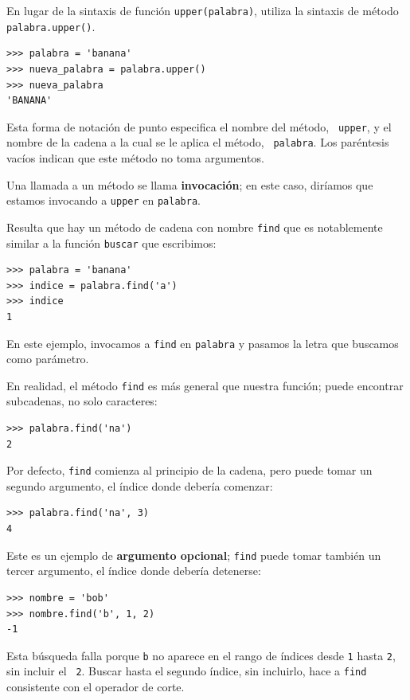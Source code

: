 \documentclass[10pt]{book}
\begin{document}
En lugar de la sintaxis de función {\tt upper(palabra)}, utiliza
la sintaxis de método {\tt palabra.upper()}.

\begin{verbatim}
>>> palabra = 'banana'
>>> nueva_palabra = palabra.upper()
>>> nueva_palabra
'BANANA'
\end{verbatim}
%
Esta forma de notación de punto especifica el nombre del método, {\tt
upper}, y el nombre de la cadena a la cual se le aplica el método, {\tt
palabra}.  Los paréntesis vacíos indican que este método no toma
argumentos.

Una llamada a un método se llama {\bf invocación}; en este caso,
diríamos que estamos invocando a {\tt upper} en {\tt palabra}.

Resulta que hay un método de cadena con nombre {\tt find} que
es notablemente similar a la función {\tt buscar} que escribimos:

\begin{verbatim}
>>> palabra = 'banana'
>>> indice = palabra.find('a')
>>> indice
1
\end{verbatim}
%
En este ejemplo, invocamos a {\tt find} en {\tt palabra} y pasamos
la letra que buscamos como parámetro.

En realidad, el método {\tt find} es más general que nuestra función;
puede encontrar subcadenas, no solo caracteres:

\begin{verbatim}
>>> palabra.find('na')
2
\end{verbatim}
%
Por defecto, {\tt find} comienza al principio de la cadena, pero
puede tomar un segundo argumento, el índice donde debería comenzar:

\begin{verbatim}
>>> palabra.find('na', 3)
4
\end{verbatim}
%
Este es un ejemplo de {\bf argumento opcional};
{\tt find} puede
tomar también un tercer argumento, el índice donde debería detenerse:

\begin{verbatim}
>>> nombre = 'bob'
>>> nombre.find('b', 1, 2)
-1
\end{verbatim}
%
Esta búsqueda falla porque {\tt b} no
aparece en el rango de índices desde {\tt 1} hasta {\tt 2}, sin incluir el {\tt
2}.  Buscar hasta el segundo índice, sin incluirlo, hace a
{\tt find} consistente con el operador de corte.
\end{document}
